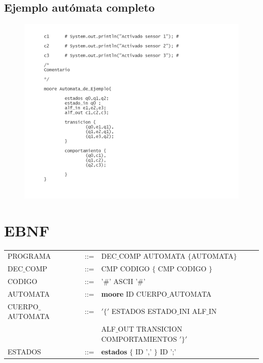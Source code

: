 \documentclass[12pt,a4paper]{article}
\begin{document}
{\subsection{Ejemplo autómata completo}
\begin{center}
\begin{figure}[h]
	\centering
	\includegraphics[width=0.75\linewidth]{img/ejemplo}
	\caption{}
	\label{fig:aut}
\end{figure}

	\end{center}
	\section{EBNF}
			\begin{center}
			\begin{tabular}{lcl}
	

				PROGRAMA & ::= & DEC$\_$COMP AUTOMATA $\{$AUTOMATA$\}$ \\ 
				 
				
				DEC$\_$COMP & ::= &CMP  CODIGO $\{$ CMP CODIGO $\}$ \\ 
			
				CODIGO 	&::= &'$\#$' ASCII '$\#$' \\ 
				
				AUTOMATA & ::= & \textbf{moore} ID CUERPO$\_$AUTOMATA \\
				
			
				CUERPO$\_$AUTOMATA	& ::= & $'\{'$ ESTADOS ESTADO$\_$INI ALF$\_$IN  \\ 
				
					& &  ALF$\_$OUT TRANSICION COMPORTAMIENTOS $'\}'$ \\ 
				
				ESTADOS	& ::= &   \textbf{estados} $\{$ ID ',' $\}$ ID ';'\\ 
				

\end{tabular}
\end{center}}
\end{document}
